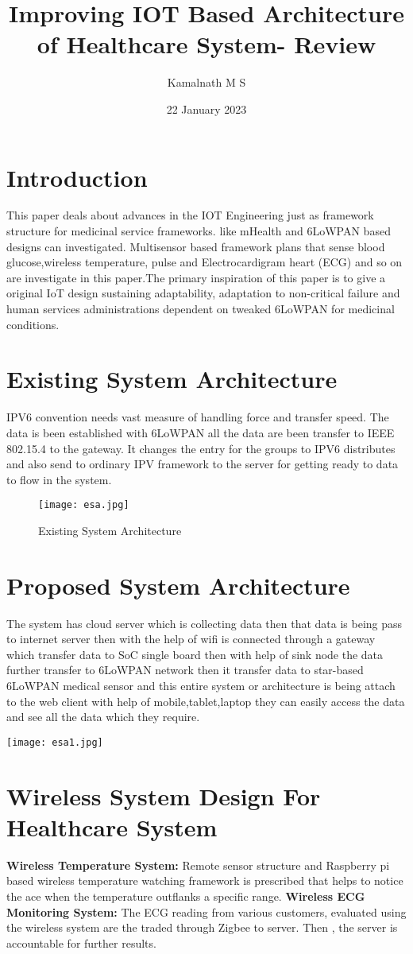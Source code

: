 \documentclass[nobib]{MSword}
\title{Improving IOT Based Architecture of Healthcare System- Review}
\author{Kamalnath M S}
\date{22 January 2023}
\begin{document}
\maketitle
\section{Introduction}
This paper deals about advances in the IOT Engineering just as framework structure for medicinal service frameworks. like mHealth and 6LoWPAN based designs can investigated. Multisensor based
framework plans that sense blood glucose,wireless temperature,
pulse and Electrocardigram heart (ECG) and so on are
investigate in this paper.The primary inspiration of this paper is to give a original IoT design sustaining
adaptability, adaptation to non-critical failure and human
services administrations dependent on tweaked 6LoWPAN for
medicinal conditions. 
\section{Existing System Architecture}
IPV6 convention needs vast measure of handling force and transfer speed. The data is been established with 6LoWPAN all the data are been transfer to IEEE 802.15.4 to the gateway. It changes the entry for the groups to IPV6 distributes and also send to ordinary IPV
framework to the server for getting ready to data to flow in the
system.
\begin{figure}
\texttt{[image: esa.jpg]}
\caption{Existing System Architecture}
\end{figure}
\clearpage
\section{Proposed System Architecture}
The system has cloud server which is collecting data then that data is being pass to internet server then with the help of wifi is connected through a gateway which transfer data to SoC single board then with help of sink node the data further transfer to 6LoWPAN network then it transfer data to star-based 6LoWPAN medical sensor and this entire system or architecture is being attach to the web client with help of mobile,tablet,laptop they can easily access the data and see all the data which they require.



\texttt{[image: esa1.jpg]}
\newline
\section{Wireless System Design For Healthcare System}
\textbf{Wireless Temperature System:} Remote sensor structure and Raspberry pi based wireless temperature watching framework is prescribed that helps to notice the ace when the temperature outflanks a specific range.
\newline
\newline
\textbf{Wireless ECG Monitoring System:} The ECG reading from various
customers, evaluated using the wireless system are the traded through Zigbee to server. Then , the server is accountable for further results.
\newline
\newline
\end{document}
